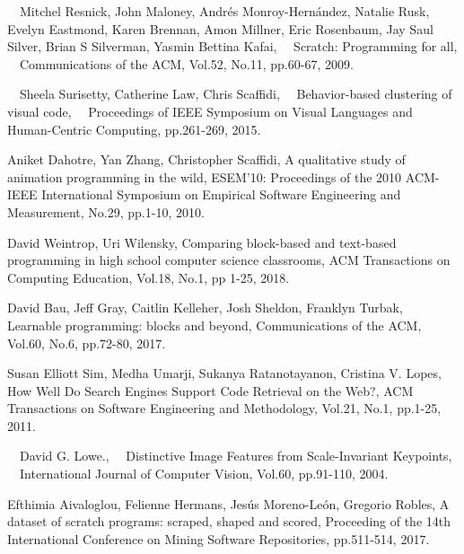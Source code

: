 \documentclass[11pt]{jreport}
\begin{document}

\begin{thebibliography}{99}

　Mitchel Resnick, John Maloney, Andr\'{e}s Monroy-Hern\'{a}ndez, Natalie Rusk, Evelyn Eastmond, Karen Brennan, 
    Amon Millner, Eric Rosenbaum, Jay Saul Silver, Brian S Silverman, Yasmin Bettina Kafai,
　Scratch: Programming for all,
　Communications of the ACM, Vol.52, No.11, pp.60-67, 2009.

　Sheela Surisetty, Catherine Law, Chris Scaffidi, 
　Behavior-based clustering of visual code,
　Proceedings of IEEE Symposium on Visual Languages and Human-Centric Computing, pp.261-269, 2015.

    Aniket Dahotre, Yan Zhang, Christopher Scaffidi,
    A qualitative study of animation programming in the wild,
    ESEM'10: Proceedings of the 2010 ACM-IEEE International Symposium on Empirical Software Engineering and Measurement,
    No.29, pp.1-10, 2010.
    
    David Weintrop, Uri Wilensky,
    Comparing block-based and text-based programming in high school computer science classrooms,
    ACM Transactions on Computing Education, Vol.18, No.1, pp 1-25, 2018.
    
    David Bau, Jeff Gray, Caitlin Kelleher, Josh Sheldon, Franklyn Turbak,
    Learnable programming: blocks and beyond,
    Communications of the ACM, Vol.60, No.6, pp.72-80, 2017. 

    Susan Elliott Sim, Medha Umarji, Sukanya Ratanotayanon, Cristina V. Lopes,
    How Well Do Search Engines Support Code Retrieval on the Web?,
    ACM Transactions on Software Engineering and Methodology, Vol.21, No.1, pp.1-25, 2011.

　David G. Lowe.,
　Distinctive Image Features from Scale-Invariant Keypoints,
　International Journal of Computer Vision, Vol.60, pp.91-110, 2004.

    Efthimia Aivaloglou, Felienne Hermans, Jes\'{u}s Moreno-Le\'{o}n, Gregorio Robles,
    A dataset of scratch programs: scraped, shaped and scored,
    Proceeding of the 14th International Conference on Mining Software Repositories, pp.511-514, 2017.
　
\end{thebibliography}
\end{document}
